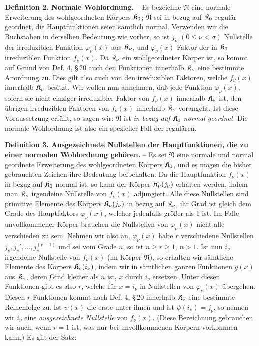 \textbf{Definition 2. Normale Wohlordnung.} -- Es bezeichne $\mathfrak N$ eine normale Erweiterung des wohlgeordneten Körpers $\mathfrak K_0$; $\mathfrak N$ sei in bezug auf $\mathfrak K_0$ regulär geordnet, die Hauptfunktionen seien sämtlich normal. Verwenden wir die Buchstaben in derselben Bedeutung wie vorher, so ist $j_\nu$ $(0\leq\nu<\sigma)$ Nullstelle der irreduziblen Funktion $\varphi_\nu(x)$ aus $\mathfrak K_\nu$, und $\varphi_\nu(x)$ Faktor der in $\mathfrak K_0$ irreduziblen Funktion $f_\nu(x)$. Da $\mathfrak K_\nu$ ein wohlgeordneter Körper ist, so kommt auf Grund von Def. 4, \S\,20 auch den Funktionen innerhalb $\mathfrak K_\nu$ eine bestimmte Anordnung zu. Dies gilt also auch von den irreduziblen Faktoren, welche $f_\nu(x)$ innerhalb $\mathfrak K_\nu$ besitzt. Wir wollen nun annehmen, daß jede Funktion $\varphi_\nu(x)$, sofern sie nicht einziger irreduzibler Faktor von $f_\nu(x)$ innerhalb $\mathfrak K_\nu$ ist, den übrigen irreduziblen Faktoren von $f_\nu(x)$ innerhalb $\mathfrak K_\nu$ vorangeht. Ist diese Voraussetzung erfüllt, so sagen wir: $\mathfrak N$ ist \emph{in bezug auf $\mathfrak K_0$ normal geordnet}. Die normale Wohlordnung ist also ein spezieller Fall der regulären.

\textbf{Definition 3. Ausgezeichnete Nullstellen der Hauptfunktionen, die zu einer normalen Wohlordnung gehören.} -- Es sei $\mathfrak N$ eine normale und normal geordnete Erweiterung des wohlgeordneten Körpers $\mathfrak K_0$, und es mögen die bisher gebrauchten Zeichen ihre Bedeutung beibehalten. Da die Hauptfunktion $f_\nu(x)$ in bezug auf $\mathfrak K_0$ normal ist, so kann der Körper $\mathfrak K_\nu(j_\nu)$ erhalten werden, indem man $\mathfrak K_\nu$ irgendeine Nullstelle von $f_\nu(x)$ adjungiert. Alle diese Nullstellen sind primitive Elemente des Körpers $\mathfrak K_\nu(j_\nu)$ in bezug auf $\mathfrak K_\nu$, ihr Grad ist gleich dem Grade des Hauptfaktors $\varphi_\nu(x)$, welcher jedenfalls größer als 1 ist. Im Falle unvollkommener Körper brauchen die Nullstellen von $\varphi_\nu(x)$ nicht alle verschieden zu sein. Nehmen wir also an, $\varphi_\nu(x)$ habe $r$ verschiedene Nullstellen $j_\nu,j_\nu',\ldots,j_\nu^{(r-1)}$ und sei vom Grade $n$, so ist $n\geq r\geq1$, $n>1$. Ist nun $i_\nu$ irgendeine Nullstelle von $f_\nu(x)$ (im Körper $\mathfrak N$), so erhalten wir sämtliche Elemente des Körpers $\mathfrak K_\nu(i_\nu)$, indem wir in sämtlichen ganzen Funktionen $g(x)$ aus $\mathfrak K_\nu$, deren Grad kleiner als $n$ ist, $x$ durch $i_\nu$ ersetzen. Unter diesen Funktionen gibt es also $r$, welche für $x=i_\nu$ in Nullstellen von $\varphi_\nu(x)$ übergehen. Diesen $r$ Funktionen kommt nach Def. 4, \S\,20 innerhalb $\mathfrak K_\nu$ eine bestimmte Reihenfolge zu. Ist $\psi(x)$ die erste unter ihnen und ist $\psi(i_\nu)=j_\nu$, so nennen wir $i_\nu$ eine \emph{ausgezeichnete Nullstelle} von $f_\nu(x)$. (Diese Bezeichnung gebrauchen wir auch, wenn $r=1$ ist, was nur bei unvollkommenen Körpern vorkommen kann.) Es gilt der Satz:

